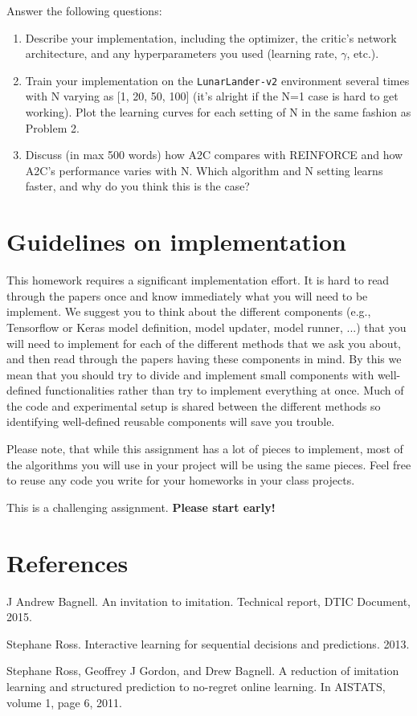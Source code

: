 \documentclass[12pt]{article}
\begin{document}
Answer the following questions:
\begin{enumerate}
\item Describe your implementation, including the optimizer, the critic's network architecture, and any hyperparameters you used (learning rate, $\gamma$, etc.).

\item Train your implementation on the \texttt{LunarLander-v2} environment several times with N varying as [1, 20, 50, 100] (it's alright if the N=1 case is hard to get working). Plot the learning curves for each setting of N in the same fashion as Problem 2.

\item Discuss (in max 500 words) how A2C compares with REINFORCE and how A2C's performance varies with N. Which algorithm and N setting learns faster, and why do you think this is the case? 
\end{enumerate}

\section*{Guidelines on implementation}

This homework requires a significant implementation effort. It is hard to read through the papers once and know immediately what you will need to be implement. We suggest you to think about the different components (e.g., Tensorflow or Keras model definition, model updater, model runner, ...) that you will need to implement for each of the different methods that we ask you about, and then read through the papers having these components in mind. By this we mean that you should try to divide and implement small components with well-defined functionalities rather than try to implement everything at once. Much of the code and experimental setup is shared between the different methods so identifying well-defined reusable components will save you trouble.

Please note, that while this assignment has a lot of pieces to implement, most of the algorithms you will use in your project will be using the same pieces. Feel free to reuse any code you write for your homeworks in your class projects.

This is a challenging assignment. \textbf{Please start early!}

\section*{References}

\noindent [1] J Andrew Bagnell. An invitation to imitation. Technical report, DTIC Document, 2015.

\noindent  [2] Stephane Ross. Interactive learning for sequential decisions and predictions. 2013.

\noindent  [3] Stephane Ross, Geoffrey J Gordon, and Drew Bagnell. A reduction of imitation learning and structured prediction to no-regret online learning. In AISTATS, volume 1, page 6, 2011.
\end{document}
